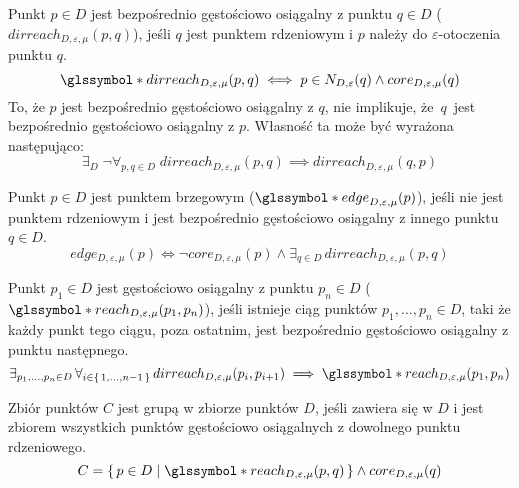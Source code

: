\newline
Punkt $ p \in D $ jest bezpośrednio gęstościowo osiągalny z punktu $ q \in D $ ($ dirreach_{D,\varepsilon,\mu}(p, q) $), jeśli $ q $ jest punktem rdzeniowym i $ p $ należy do $ \varepsilon $-otoczenia punktu $ q $.
\begin{equation} \label{direct-reachability}
	\s{dirreach}_{D,\varepsilon,\mu}(p, q) \iff p \in N_{D,\varepsilon}(q) \land core_{D,\varepsilon,\mu}(q)
\end{equation}
To, że $ p $ jest bezpośrednio gęstościowo osiągalny z $ q $, nie implikuje, \mbox{że $ q $ jest} bezpośrednio gęstościowo osiągalny z $ p $. Własność ta może być wyrażona następująco:
\begin{equation} \label{direct-reachability-asymmetry}
	\exists_D\;\neg\forall_{p,q\in D}\;dirreach_{D,\varepsilon,\mu}(p, q) \implies dirreach_{D,\varepsilon,\mu}(q, p)
\end{equation}

\newline
Punkt $ p \in D $ jest punktem brzegowym ($ \s{edge}_{D,\varepsilon,\mu}(p) $), jeśli nie jest punktem rdzeniowym i jest bezpośrednio gęstościowo osiągalny z innego \mbox{punktu $ q \in D $}.
\begin{equation}\label{edge-point}
	edge_{D,\varepsilon,\mu}(p) \iff \neg core_{D,\varepsilon,\mu}(p) \land \exists_{q\in D}\, dirreach_{D,\varepsilon,\mu}(p,q)
\end{equation}

\newline
Punkt $ p_1 \in D$ jest gęstościowo osiągalny z punktu $ p_n\in D $ ($ \s{reach}_{D,\varepsilon,\mu}(p_1, p_n) $), jeśli istnieje ciąg punktów $ p_1,\dots,p_n \in D $, taki że każdy punkt tego ciągu, poza ostatnim, jest bezpośrednio gęstościowo osiągalny z punktu następnego.
\begin{equation}
	\exists_{p_1,\dots,p_n\in D}\,\forall_{i\in\set{1,\dots,n-1}}\,dirreach_{D,\varepsilon,\mu}(p_i, p_{i+1}) \implies \s{reach}_{D,\varepsilon,\mu}(p_1, p_n)
\end{equation}



\newline
Zbiór punktów $ C $ jest grupą w zbiorze punktów $ D $, jeśli zawiera się w $ D $ i jest zbiorem wszystkich punktów gęstościowo osiągalnych z dowolnego punktu rdzeniowego. 
\begin{equation}\label{eq:cluster-def}
C = \set{p \in D | \s{reach}_{D,\varepsilon,\mu}(p, q)} \land core_{D,\varepsilon,\mu}(q)
\end{equation}

